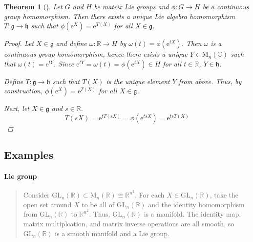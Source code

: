 \documentclass[letterpaper, 10pt]{article}
\theoremstyle{theostyle}
\newtheorem{theorem}{Theorem}[section]
\newenvironment{thmstyle}[1][]{%
    \begin{theorem}[#1]\leavevmode\vspace{-\baselineskip}\myquote%
    }{\endmyquote\end{theorem}}
\begin{document}
\begin{thmstyle}
    Let \(G\) and \(H\) be matrix Lie groups and \(\phi: G \rightarrow H\) be a continuous group homomorphism.
    Then there exists a unique Lie algebra homomorphism \(T : \mathfrak{g} \rightarrow \mathfrak{h}\) such that \(\phi\left(\mathrm{e}^X \right) = \mathrm{e}^{T(X)}\) for all \(X \in \mathfrak{g}\).

    \begin{proof}
        Let \(X \in \mathfrak{g}\) and define \(\omega: \mathbb{R} \rightarrow H\) by \(\omega(t) = \phi \left(\mathrm{e}^{tX}\right)\).
        Then \(\omega\) is a continuous group homomorphism, hence there exists a unique \(Y \in \mathrm{M}_n(\mathbb{C})\) such that \(\omega(t) = \mathrm{e}^{tY}\).
        Since \(\mathrm{e}^{tY} = \omega(t) = \phi\left(\mathrm{e}^{tX}\right) \in H\) for all \(t \in \mathbb{R}\), \(Y \in \mathfrak{h}\).

        Define \(T : \mathfrak{g} \rightarrow \mathfrak{h}\) such that \(T(X)\) is the unique element \(Y\) from above.
        Thus, by construction, \(\phi \left(\mathrm{e}^X\right) = \mathrm{e}^{T(X)}\) for all \(X \in \mathfrak{g}\).

        Next, let \(X \in \mathfrak{g}\) and \(s \in \mathbb{R}\).
        \[T(sX) = \mathrm{e}^{tT(sX)} = \phi\left(\mathrm{e}^{tsX}\right) = \mathrm{e}^{tsT(X)}\]
    \end{proof}
\end{thmstyle}

\subsection{Examples}

\paragraph{Lie group}
\begin{quote}
    Consider \(\mathrm{GL}_n(\mathbb{R}) \subset \mathrm{M}_n (\mathbb{R}) \cong \mathbb{R}^{n^2}\).
    For each \(X \in \mathrm{GL}_n (\mathbb{R})\), take the open set around \(X\) to be all of \(\mathrm{GL}_n(\mathbb{R})\) and the identity homomorphism
    from \(\mathrm{GL}_n(\mathbb{R})\) to \(\mathbb{R}^{n^2}\).
    Thus, \(\mathrm{GL}_n(\mathbb{R})\) is a manifold.
    The identity map, matrix multiplcation, and matrix inverse operations are all smooth, so \(\mathrm{GL}_n(\mathbb{R})\) is a smooth manifold and a Lie group.
\end{quote}
\end{document}
